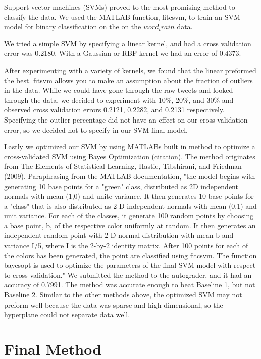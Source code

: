 \documentclass[]{article}
\begin{document}
Support vector machines (SVMs) proved to the most promising method to classify the data. We used the MATLAB function, fitcsvm, to train an SVM model for binary classification on the on the $word_train$ data.

We tried a simple SVM by specifying a linear kernel, and had a  cross validation error was 0.2180. With a Gaussian or RBF kernel we had an error of 0.4373. 


After experimenting with a variety of kernels, we found that the linear preformed the best. fitsvm allows you to make an assumption about the fraction of outliers in the data. While we could have gone through the raw tweets and looked through the data, we decided to experiment with  10\%, 20\%, and 30\% and observed cross validation errors 0.2121, 0.2282, and 0.2131 respectively. Specifying the outlier percentage did not have an effect on our cross validation error, so we decided not to specify in our SVM final model. 

Lastly we optimized our SVM by using MATLABs built in method to optimize a cross-validated SVM using Bayes Optimization (citation). The method originates from The Elements of Statistical Learning, Hastie, Tibshirani, and Friedman (2009). Paraphrasing from the MATLAB documentation,  "the model begins with generating 10 base points for a "green" class, distributed as 2D independent normals with mean (1,0) and unite variance. It then generates 10 base points for a "class" that is also distributed as 2-D independent normals with mean (0,1) and unit variance. For each of the classes, it generate 100 random points by choosing a base point, b, of the respective color uniformly at random. It then generates an independent random point with 2-D normal distribution with mean b and variance I/5, where I is the 2-by-2 identity matrix. After 100 points for each of the colors has been generated, the point are classified using fitcsvm. The function bayesopt is used to optimize the parameters of the final SVM model with respect to cross validation." We submitted the method to the autograder, and it had an accuracy of 0.7991. The method was accurate enough to beat Baseline 1, but not Baseline 2. Similar to the other methods above, the optimized SVM may not preform well because the data was sparse and high dimensional, so the hyperplane could not separate data well. 

\section{Final Method}
\end{document}

